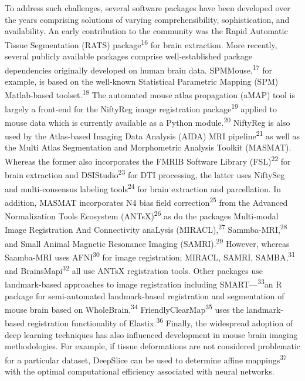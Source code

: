 \documentclass[
  12pt,
]{article}
\begin{document}
To address such challenges, several software packages have been
developed over the years comprising solutions of varying
comprehensibility, sophistication, and availability. An early
contribution to the community was the Rapid Automatic Tissue
Segmentation (RATS) package\textsuperscript{16} for brain extraction.
More recently, several publicly available packages comprise
well-established package dependencies originally developed on human
brain data. SPMMouse,\textsuperscript{17} for example, is based on the
well-known Statistical Parametric Mapping (SPM) Matlab-based
toolset.\textsuperscript{18} The automated mouse atlas propagation
(aMAP) tool is largely a front-end for the NiftyReg image registration
package\textsuperscript{19} applied to mouse data which is currently
available as a Python module.\textsuperscript{20} NiftyReg is also used
by the Atlas-based Imaging Data Analysis (AIDA) MRI
pipeline\textsuperscript{21} as well as the Multi Atlas Segmentation and
Morphometric Analysis Toolkit (MASMAT). Whereas the former also
incorporates the FMRIB Software Library (FSL)\textsuperscript{22} for
brain extraction and DSIStudio\textsuperscript{23} for DTI processing,
the latter uses NiftySeg and multi-consensus labeling
tools\textsuperscript{24} for brain extraction and parcellation. In
addition, MASMAT incorporates N4 bias field
correction\textsuperscript{25} from the Advanced Normalization Tools
Ecosystem (ANTsX)\textsuperscript{26} as do the packages Multi-modal
Image Registration And Connectivity anaLysis
(MIRACL),\textsuperscript{27} Sammba-MRI,\textsuperscript{28} and Small
Animal Magnetic Resonance Imaging (SAMRI).\textsuperscript{29} However,
whereas Saamba-MRI uses AFNI\textsuperscript{30} for image registration;
MIRACL, SAMRI, SAMBA,\textsuperscript{31} and
BrainsMapi\textsuperscript{32} all use ANTsX registration tools. Other
packages use landmark-based approaches to image registration including
SMART---\textsuperscript{33}an R package for semi-automated
landmark-based registration and segmentation of mouse brain based on
WholeBrain.\textsuperscript{34} FriendlyClearMap\textsuperscript{35}
uses the landmark-based registration functionality of
Elastix.\textsuperscript{36} Finally, the widespread adoption of deep
learning techniques has also influenced development in mouse brain
imaging methodologies. For example, if tissue deformations are not
considered problematic for a particular dataset, DeepSlice can be used
to determine affine mappings\textsuperscript{37} with the optimal
computational efficiency associated with neural networks.
\end{document}
